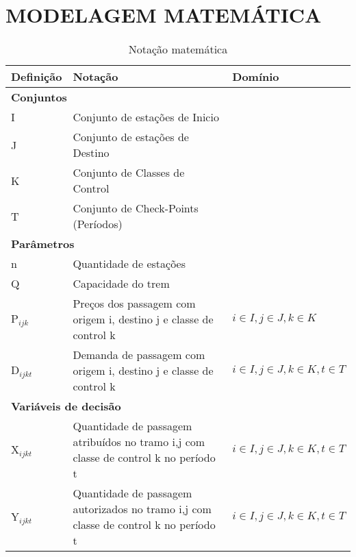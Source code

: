 \documentclass[10pt,a4paper]{article}
\begin{document}
\section{MODELAGEM MATEMÁTICA}

\begin{table}[H]
	\centering
	\small
	\begin{tabular}{@{}lll@{}}
		\toprule
		\textbf{Definição} & \textbf{Notação}                                                                     & \textbf{Domínio}                     \\ \midrule
		\multicolumn{3}{l}{\textbf{Conjuntos}}                                                                                                           \\ \midrule
		I                  & Conjunto de estações de Inicio                                                       &                                      \\
		J                  & Conjunto de estações de Destino                                                      &                                      \\
		K                  & Conjunto de Classes de Control                                                       &                                      \\
		T                  & Conjunto de Check-Points (Períodos)                                                  &                                      \\ \midrule
		\multicolumn{3}{l}{\textbf{Parâmetros}}                                                                                                          \\ \midrule
		n                  & Quantidade de estações                                                               &                                      \\
		Q                  & Capacidade do trem                                                                   &                                      \\
		P$_{ijk}$          & Preços  dos passagem com origem i, destino j e classe de control k                   & $i \in I, j \in J, k \in K$          \\
		D$_{ijkt}$         & Demanda  de passagem com origem i, destino j e classe de control k                   & $i \in I, j \in J, k \in K, t \in T$ \\ \midrule
		\multicolumn{3}{l}{\textbf{Variáveis de decisão}}                                                                                                \\ \midrule
		X$_{ijkt}$         & Quantidade de passagem atribuídos no tramo i,j com classe de control k no período t  & $i \in I, j \in J, k \in K, t \in T$ \\
		Y$_{ijkt}$         & Quantidade de passagem autorizados no tramo i,j com classe de control k no período t & $i \in I, j \in J, k \in K, t \in T$ \\ \bottomrule
	\end{tabular}
	\caption{Notação matemática}
	\label{Notacao}
\end{table}
\end{document}
